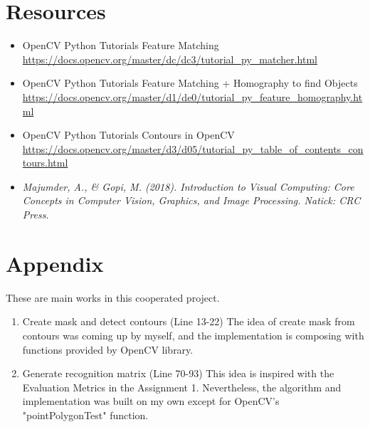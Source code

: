 \documentclass{article}
\begin{document}
\section*{Resources}

\begin{itemize}
    \item OpenCV Python Tutorials\: Feature Matching
        \subitem \url{https://docs.opencv.org/master/dc/dc3/tutorial_py_matcher.html}
    \item OpenCV Python Tutorials\: Feature Matching + Homography to find Objects
        \subitem \url{https://docs.opencv.org/master/d1/de0/tutorial_py_feature_homography.html}
    \item OpenCV Python Tutorials\: Contours in OpenCV
        \subitem \url{https://docs.opencv.org/master/d3/d05/tutorial_py_table_of_contents_contours.html}
    \item \textit{Majumder, A., \& Gopi, M. (2018). Introduction to Visual Computing: Core Concepts in Computer Vision, Graphics, and Image Processing. Natick: CRC Press.}
\end{itemize}

\section*{Appendix}

These are main works in this cooperated project.
\begin{enumerate}
    \item Create mask and detect contours (Line 13-22)
        \subitem The idea of create mask from contours was coming up by myself, and the implementation is composing with functions provided by OpenCV library.
    \item Generate recognition matrix (Line 70-93)
        \subitem This idea is inspired with the Evaluation Metrics in the Assignment 1. Nevertheless, the algorithm and implementation was built on my own except for OpenCV's "pointPolygonTest" function.
\end{enumerate}
\end{document}
